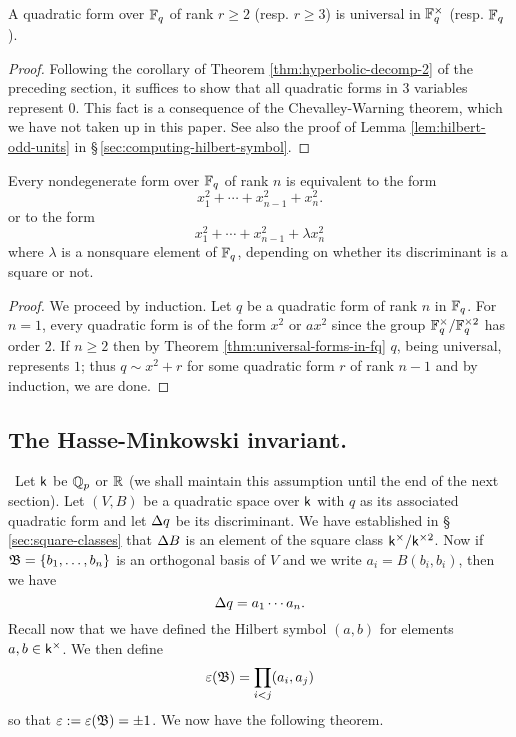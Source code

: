 \begin{theoremx}{\normalfont\cite[p.~34]{serre2012course}} A quadratic form over
    \(\mathbb{F}_q\) of rank \(r \geq 2\) (resp. \(r \geq 3\)) is universal in
    \(\mathbb{F}_q^\times\) (resp.
    \(\mathbb{F}_q\)).\label{thm:universal-forms-in-fq}
\end{theoremx}

\begin{proof}
    Following the corollary of Theorem \ref{thm:hyperbolic-decomp-2} of the
    preceding section, it suffices to show that all quadratic forms in \(3\)
    variables represent \(0\). This fact is a consequence of the
    Chevalley-Warning theorem, which we have not taken up in this paper. See
    also the proof of Lemma \ref{lem:hilbert-odd-units} in
    \S\,\ref{sec:computing-hilbert-symbol}. 
\end{proof}

\begin{theoremx}\label{thm:quadratic-forms-fq-rank-n} Every nondegenerate form
    over \(\mathbb{F}_q\) of rank \(n\) is equivalent to the form
    \[
        x_1^2 + \cdots + x_{n-1}^2 + x_n^2.
    \]
    or to the form
    \[
        x_1^2 + \cdots + x_{n-1}^2 + \lambda x_n^2
    \]
    where \(\lambda\) is a nonsquare element of \(\mathbb{F}_q\), depending on
    whether its discriminant is a square or not.
\end{theoremx}

\begin{proof}
    We proceed by induction. Let \(q\) be a quadratic form of rank \(n\) in
    \(\mathbb{F}_q\). For \(n = 1\), every quadratic form is of the form
    \(x^2\) or \(ax^2\) since the group \(\mathbb{F}_q^{\times} /
    \mathbb{F}_q^{\times2}\) has order \(2\). If \(n \geq 2\) then by Theorem
    \ref{thm:universal-forms-in-fq} \(q\), being universal, represents \(1\);
    thus \(q \sim x^2 + r\) for some quadratic form \(r\) of rank \(n - 1\) and
    by induction, we are done.
\end{proof}

\subsection{The Hasse-Minkowski invariant.}~Let \(\mathsf{k}\) be \(\mathbb{Q}_p\)
or \(\mathbb{R}\) (we shall maintain this assumption until the end of the next
section). Let \((V, B)\) be a quadratic space over \(\mathsf{k}\) with \(q\) as its
associated quadratic form and let \({\Delta} q\) be its discriminant. We have
established in \S\,\ref{sec:square-classes} that \({\Delta} B\) is an element of
the square class \(\mathsf{k}^{\times}/\mathsf{k}^{\times2}\). Now if \(\mathfrak{B} = \{b_1, \dots, b_n\}\) is an
orthogonal basis of \(V\) and we write \(a_{i} = B(b_i, b_i)\), then we
have\label{sec:hasse-invariant}
\[
    {\Delta} q = a_1 \cdots a_n.  
\]
Recall now that we have defined the Hilbert symbol \((a, b)\) for elements \(a,
b \in \mathsf{k}^{\times}\). We then define
\[
    \varepsilon(\mathfrak{B}) = \prod_{i < j} (a_i, a_j)
\]
so that \(\varepsilon := \varepsilon(\mathfrak{B}) = \pm 1\). We now have the following
theorem.

